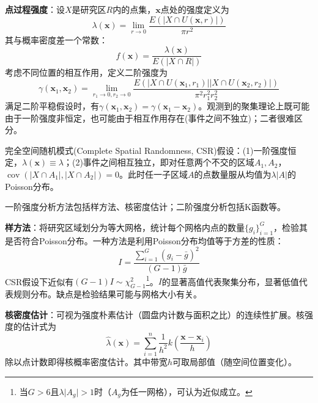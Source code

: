 \par \textbf{点过程强度}：设$X$是研究区$R$内的点集，$\mathbf{x}$点处的强度定义为
\begin{equation*}
\lambda(\mathbf{x})=\lim\limits_{r\to 0}\frac{E(\vert X\cap U(\mathbf{x},r) \vert)}{\pi r^2}
\end{equation*}
其与概率密度差一个常数：
\begin{equation}
f(\mathbf{x})=\frac{\lambda(\mathbf{x})}{E(\vert X\cap R \vert)}
\end{equation}
考虑不同位置的相互作用，定义二阶强度为
\begin{equation*}
\gamma(\mathbf{x}_1,\mathbf{x}_2)=\lim\limits_{r_1\to 0,r_2\to 0}\frac{E(\vert X\cap U(\mathbf{x}_1,r_1) \vert\vert X\cap U(\mathbf{x}_2,r_2) \vert)}{\pi^2 r_1^2r_2^2}
\end{equation*}
满足二阶平稳假设时，有$\gamma(\mathbf{x}_1,\mathbf{x}_2)=\gamma(\mathbf{x}_1-\mathbf{x}_2)$。观测到的聚集理论上既可能由于一阶强度非恒定，也可能由于相互作用存在(事件之间不独立)；二者很难区分。

\par 完全空间随机模式(Complete Spatial Randomness, CSR)假设：(1)一阶强度恒定，$\lambda(\mathbf{x})\equiv \lambda$；(2)事件之间相互独立，即对任意两个不交的区域$A_1,A_2$，$\operatorname{cov}(\vert X\cap A_1\vert,\vert X\cap A_2\vert)=0$。此时任一子区域$A$的点数量服从均值为$\lambda \vert A \vert$的Poisson分布。

\par 一阶强度分析方法包括样方法、核密度估计；二阶强度分析包括K函数等。

\par \textbf{样方法}：将研究区域划分为等大网格，统计每个网格内点的数量$\{g_i\}_{i=1}^G$，检验其是否符合Poisson分布。一种方法是利用Poisson分布均值等于方差的性质：
\begin{equation}
    I = \frac{\sum_{i=1}^G (g_i-\bar{g})^2}{(G-1)\bar{g}}
\end{equation}
CSR假设下近似有$(G-1)I \sim \chi_{G-1}^2$\footnote{当$G>6$且$\lambda\vert A_g\vert>1$时（$A_g$为任一网格），可认为近似成立。}。$I$的显著高值代表聚集分布，显著低值代表规则分布。缺点是检验结果可能与网格大小有关。

\par \textbf{核密度估计}：可视为强度朴素估计（圆盘内计数与面积之比）的连续性扩展。核强度的估计式为
\begin{equation}
    \hat{\lambda}(\mathbf{x})=\sum_{i=1}^n \frac{1}{h^2} k\left(\frac{\mathbf{x}-\mathbf{x}_i}{h}\right)
\end{equation}
除以点计数即得核概率密度估计。其中带宽$h$可取局部值（随空间位置变化）。

